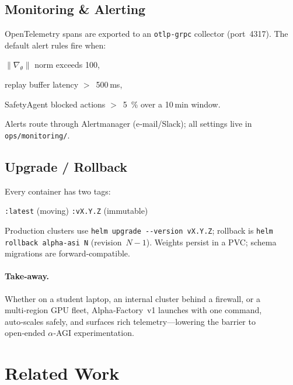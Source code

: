 \subsection{Monitoring \& Alerting}

OpenTelemetry spans are exported to an \texttt{otlp-grpc} collector (port 4317). The default alert rules fire when:

\begin{enumerate*}
  \item $\lVert\nabla_\theta\rVert$ norm exceeds 100,
  \item replay buffer latency $>$ 500 ms,
  \item SafetyAgent blocked actions $>$ 5 \% over a 10 min window.
\end{enumerate*}

Alerts route through Alertmanager (e‑mail/Slack);
all settings live in \texttt{ops/monitoring/}.

\subsection{Upgrade / Rollback}

Every container has two tags:

\begin{center}
  \texttt{:latest} (moving) \quad\textbullet\quad \texttt{:vX.Y.Z} (immutable)
\end{center}

Production clusters use \verb|helm upgrade --version vX.Y.Z|;
rollback is \verb|helm rollback alpha-asi N| (revision $N-1$).
Weights persist in a PVC; schema migrations are forward‑compatible.

\paragraph{Take‑away.} Whether on a student laptop, an internal cluster behind a firewall, or a multi‑region GPU fleet, Alpha‑Factory v1 launches with one command, auto‑scales safely, and surfaces rich telemetry—lowering the barrier to open‑ended $\alpha$‑AGI experimentation.

\section{Related Work}\label{sec:related}

